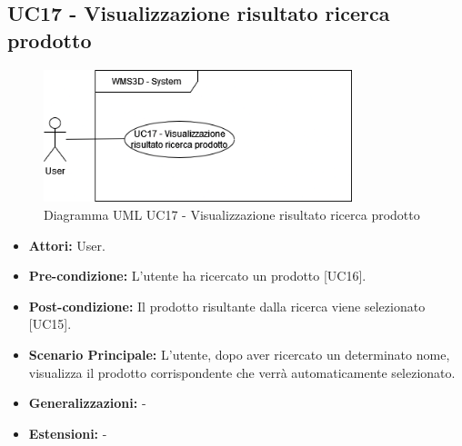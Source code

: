 \subsection{UC17 - Visualizzazione risultato ricerca prodotto}
\begin{figure}[H]
  \centering
  \includegraphics[width=0.8\textwidth]{UC_diagrams_11-20/UC17.drawio.png}
   \caption{Diagramma UML UC17 - Visualizzazione risultato ricerca prodotto}
\end{figure}
\begin{itemize}
    \item \textbf{Attori:} User.
    \item \textbf{Pre-condizione:} L'utente ha ricercato un prodotto [UC16].
    \item \textbf{Post-condizione:} Il prodotto risultante dalla ricerca viene selezionato [UC15].
    \item \textbf{Scenario Principale:} L'utente, dopo aver ricercato un determinato nome, visualizza il prodotto corrispondente che verrà automaticamente selezionato.
    \item \textbf{Generalizzazioni:} -
    \item \textbf{Estensioni:} -
\end{itemize}